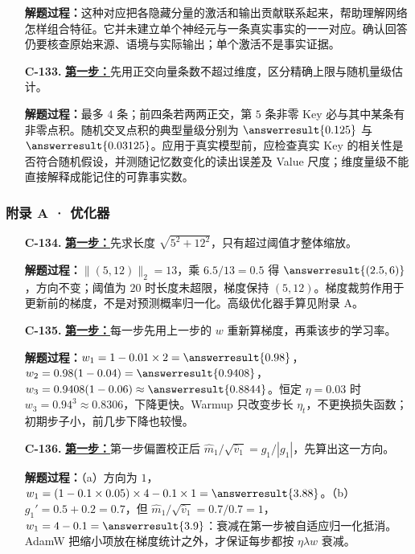 \begin{enumerate}[label={},leftmargin=4.8em,itemsep=4pt]
\textbf{解题过程：}这种对应把各隐藏分量的激活和输出贡献联系起来，帮助理解网络怎样组合特征。它并未建立单个神经元与一条真实事实的一一对应。确认回答仍要核查原始来源、语境与实际输出；单个激活不是事实证据。
\item[\textbf{C-133.}] \leavevmode{}\label{solution:C-133}\label{solution:memory-random-capacity}\hyperref[exercise:memory-random-capacity]{\textbf{第一步：}}先用正交向量条数不超过维度，区分精确上限与随机量级估计。\par\nobreak
\textbf{解题过程：}最多 $4$ 条；前四条若两两正交，第 $5$ 条非零 Key 必与其中某条有非零点积。随机交叉点积的典型量级分别为 $\answerresult{0.125}$ 与 $\answerresult{0.03125}$。应用于真实模型前，应检查真实 Key 的相关性是否符合随机假设，并测随记忆数变化的读出误差及 Value 尺度；维度量级不能直接解释成能记住的可靠事实数。
\end{enumerate}
\subsubsection*{附录 A · 优化器}
\begin{enumerate}[label={},leftmargin=4.8em,itemsep=4pt]
\item[\textbf{C-134.}] \leavevmode{}\label{solution:C-134}\label{solution:optimizer-clipping}\hyperref[exercise:optimizer-clipping]{\textbf{第一步：}}先求长度 $\sqrt{5^2+12^2}$，只有超过阈值才整体缩放。\par\nobreak
\textbf{解题过程：}$\|(5,12)\|_2=13$，乘 $6.5/13=0.5$ 得 $\answerresult{(2.5,6)}$，方向不变；阈值为 $20$ 时长度未超限，梯度保持 $(5,12)$。梯度裁剪作用于更新前的梯度，不是对预测概率归一化。高级优化器手算见附录 A。
\item[\textbf{C-135.}] \leavevmode{}\label{solution:C-135}\label{solution:optimizer-warmup}\hyperref[exercise:optimizer-warmup]{\textbf{第一步：}}每一步先用上一步的 $w$ 重新算梯度，再乘该步的学习率。\par\nobreak
\textbf{解题过程：}$w_1=1-0.01\times2=\answerresult{0.98}$，$w_2=0.98(1-0.04)=\answerresult{0.9408}$，$w_3=0.9408(1-0.06)\approx\answerresult{0.8844}$。恒定 $\eta=0.03$ 时 $w_3=0.94^3\approx0.8306$，下降更快。Warmup 只改变步长 $\eta_t$，不更换损失函数；初期步子小，前几步下降也较慢。
\item[\textbf{C-136.}] \leavevmode{}\label{solution:C-136}\label{solution:optimizer-adamw}\hyperref[exercise:optimizer-adamw]{\textbf{第一步：}}第一步偏置校正后 $\widehat{m}_1/\sqrt{\widehat{v}_1}=g_1/|g_1|$，先算出这一方向。\par\nobreak
\textbf{解题过程：}（a）方向为 $1$，$w_1=(1-0.1\times0.05)\times4-0.1\times1=\answerresult{3.88}$。（b）$g_1'=0.5+0.2=0.7$，但 $\widehat{m}_1/\sqrt{\widehat{v}_1}=0.7/0.7=1$，$w_1=4-0.1=\answerresult{3.9}$：衰减在第一步被自适应归一化抵消。AdamW 把缩小项放在梯度统计之外，才保证每步都按 $\eta\lambda w$ 衰减。
\end{enumerate}
